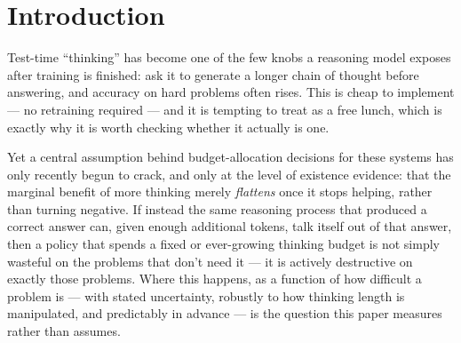 \documentclass[11pt]{article}
\begin{document}
\section{Introduction}

Test-time ``thinking'' has become one of the few knobs a reasoning model exposes after training is finished: ask it to generate a longer chain of thought before answering, and accuracy on hard problems often rises. This is cheap to implement --- no retraining required --- and it is tempting to treat as a free lunch, which is exactly why it is worth checking whether it actually is one.

Yet a central assumption behind budget-allocation decisions for these systems has only recently begun to crack, and only at the level of existence evidence: that the marginal benefit of more thinking merely \emph{flattens} once it stops helping, rather than turning negative. If instead the same reasoning process that produced a correct answer can, given enough additional tokens, talk itself out of that answer, then a policy that spends a fixed or ever-growing thinking budget is not simply wasteful on the problems that don't need it --- it is actively destructive on exactly those problems. Where this happens, as a function of how difficult a problem is --- with stated uncertainty, robustly to how thinking length is manipulated, and predictably in advance --- is the question this paper measures rather than assumes.
\end{document}
